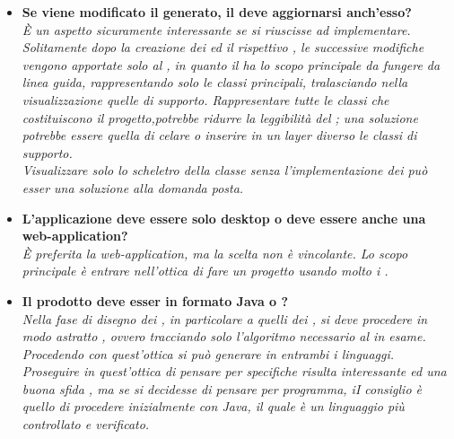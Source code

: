 \begin{itemize}
	    \item
	    \textbf{Se viene modificato il  generato, il  deve aggiornarsi anch'esso?\\}
	    \justifying
	    \emph{È un aspetto sicuramente interessante se si riuscisse ad implementare. Solitamente dopo la creazione dei  ed il rispettivo , le successive modifiche vengono apportate solo al , in quanto il  ha lo scopo principale da fungere da linea guida, rappresentando solo le classi principali, tralasciando nella visualizzazione quelle di supporto. Rappresentare tutte le classi che costituiscono il progetto,potrebbe ridurre la leggibilità del ; una soluzione potrebbe essere quella di celare o inserire in un layer diverso le classi di supporto.\\
     Visualizzare solo lo scheletro della classe senza l'implementazione dei  può esser una soluzione alla domanda posta.\\}
	     
	   	 \item
	   	 \textbf{L'applicazione deve essere solo desktop o deve essere anche una web-application?\\}
	   	 \justifying
	   	 \emph{È preferita la web-application, ma la scelta non è vincolante. Lo scopo principale è entrare nell'ottica di fare un progetto usando molto i .\\}  
			 	
		   	 \item
	   	 \textbf{Il  prodotto deve esser in formato Java o ?\\}
	   	 \justifying
	   	 \emph{Nella fase di disegno dei  , in particolare a quelli dei , si deve procedere in modo astratto , ovvero tracciando solo l'algoritmo necessario al  in esame. Procedendo con quest'ottica si può generare  in entrambi i linguaggi. Proseguire in quest'ottica di pensare per specifiche risulta interessante ed una buona sfida , ma se si decidesse di pensare per programma, iI consiglio è quello di procedere inizialmente con Java, il quale è un linguaggio più controllato e verificato.\\}
		

\end{itemize}
